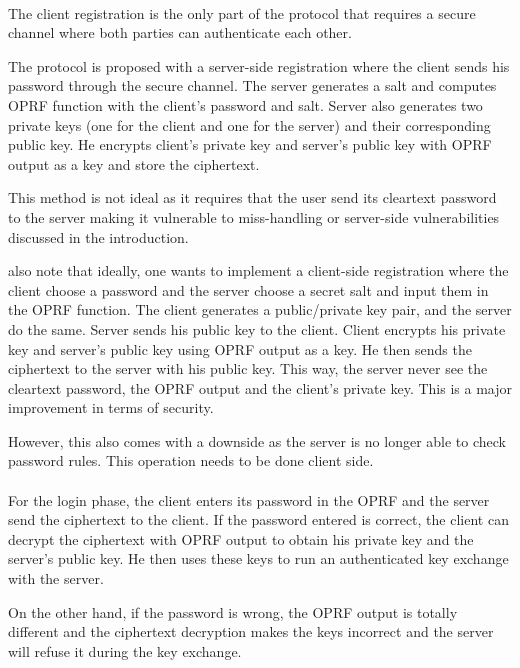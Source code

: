 \documentclass[../report.tex]{subfiles}
\begin{document}
\paragraph{} \label{sec:opaque_register}
The client registration is the only part of the protocol that requires a secure channel where both parties can authenticate each other.


The protocol is proposed with a server-side registration where the client sends his password through the secure channel. The server generates a salt and computes OPRF function with the client's password and salt. Server also generates two private keys (one for the client and one for the server) and their corresponding public key. He encrypts client's private key and server's public key with OPRF output as a key and store the ciphertext.


This method is not ideal as it requires that the user send its cleartext password to the server making it vulnerable to miss-handling or server-side vulnerabilities discussed in the introduction.


\cite{OPAQUE_Paper} also note that ideally, one wants to implement a client-side registration where the client choose a password and the server choose a secret salt and input them in the OPRF function. The client generates a public/private key pair, and the server do the same. Server sends his public key to the client. Client encrypts his private key and server's public key using OPRF output as a key. He then sends the ciphertext to the server with his public key.
This way, the server never see the cleartext password, the OPRF output and the client's private key. This is a major improvement in terms of security.

However, this also comes with a downside as the server is no longer able to check password rules. This operation needs to be done client side.


\paragraph{}
For the login phase, the client enters its password in the OPRF and the server send the ciphertext to the client.
If the password entered is correct, the client can decrypt the ciphertext with OPRF output to obtain his private key and the server's public key.
He then uses these keys to run an authenticated key exchange with the server.

On the other hand, if the password is wrong, the OPRF output is totally different and the ciphertext decryption makes the keys incorrect and the server will refuse it during the key exchange. %
\end{document}
